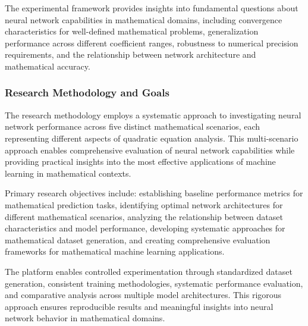 \documentclass[11pt,a4paper]{report}
\begin{document}
The experimental framework provides insights into fundamental questions about neural network capabilities in mathematical domains, including convergence characteristics for well-defined mathematical problems, generalization performance across different coefficient ranges, robustness to numerical precision requirements, and the relationship between network architecture and mathematical accuracy.

\subsubsection{Research Methodology and Goals}

The research methodology employs a systematic approach to investigating neural network performance across five distinct mathematical scenarios, each representing different aspects of quadratic equation analysis. This multi-scenario approach enables comprehensive evaluation of neural network capabilities while providing practical insights into the most effective applications of machine learning in mathematical contexts.

Primary research objectives include: establishing baseline performance metrics for mathematical prediction tasks, identifying optimal network architectures for different mathematical scenarios, analyzing the relationship between dataset characteristics and model performance, developing systematic approaches for mathematical dataset generation, and creating comprehensive evaluation frameworks for mathematical machine learning applications.

The platform enables controlled experimentation through standardized dataset generation, consistent training methodologies, systematic performance evaluation, and comparative analysis across multiple model architectures. This rigorous approach ensures reproducible results and meaningful insights into neural network behavior in mathematical domains.
\end{document}
